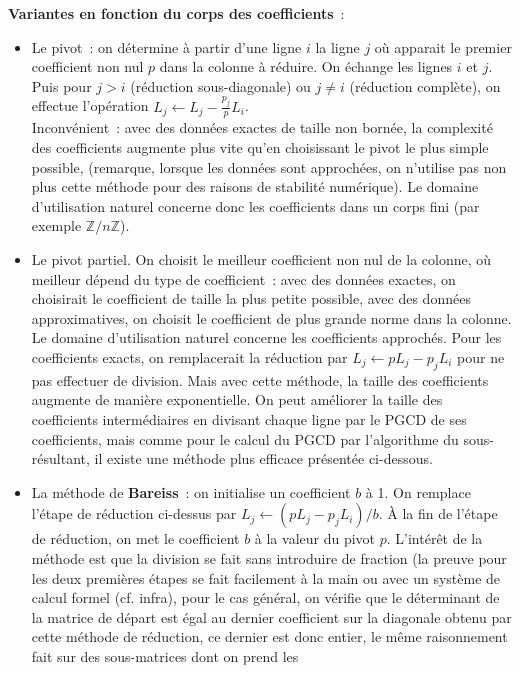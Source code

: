 \documentclass[a4paper,11pt]{book}
\begin{document}
\begin{giacjshere}
{\bf Variantes en fonction du corps des coefficients}~:
\begin{itemize}
\item Le pivot~: on détermine à partir d'une ligne $i$ 
la ligne $j$ où apparait le premier coefficient non nul $p$ dans
la colonne à réduire. On échange les lignes
$i$ et $j$. Puis pour $j>i$ (réduction sous-diagonale)
ou $j\neq i$ (réduction complète), on effectue l'opération
$L_j \leftarrow L_j - \frac{p_j}{p}L_i$.\\
Inconv\'enient~: avec des donn\'ees exactes de taille non born\'ee, 
la complexité des coefficients augmente plus vite qu'en choisissant 
le pivot le plus simple possible, (remarque, lorsque les donn\'ees 
sont approch\'ees, on n'utilise pas non plus cette méthode
pour des raisons de stabilit\'e num\'erique).
Le domaine d'utilisation naturel concerne donc les coefficients
dans un corps fini (par exemple $\mathbb{Z}/n\mathbb{Z}$).
\item Le pivot partiel. On choisit le meilleur coefficient non nul de la
colonne, où meilleur dépend du type de coefficient~: avec des données
exactes, on choisirait le coefficient de taille la plus petite possible,
avec des donn\'ees approximatives, on choisit
le coefficient de plus grande norme dans la colonne.
Le domaine d'utilisation naturel concerne les coefficients
approch\'es. Pour les coefficients exacts, on remplacerait la
réduction par $L_j \leftarrow pL_j -p_j L_i$ pour ne pas effectuer
de division. Mais avec cette méthode, la taille des coefficients
augmente de manière exponentielle. On peut améliorer
la taille des coefficients intermédiaires en divisant chaque
ligne par le PGCD de ses coefficients, mais comme pour le
calcul du PGCD par l'algorithme du sous-résultant, il existe
une méthode plus efficace présentée ci-dessous.
\item La m\'ethode de {\bf Bareiss}~: on initialise un coefficient $b$ \`a 1.
On remplace l'\'etape de r\'eduction ci-dessus
par $L_j \leftarrow (pL_j -p_j L_i)/b$.
\`A la fin de l'\'etape de r\'eduction, on met le coefficient $b$
\`a la valeur du pivot $p$. L'intérêt de la méthode est que la division
se fait sans introduire de fraction (la preuve pour les deux premi\`eres
\'etapes se fait facilement \`a la main ou avec
un système de calcul formel (cf. infra), pour le cas g\'en\'eral, on v\'erifie
que le d\'eterminant de la matrice de d\'epart
est \'egal au dernier coefficient sur la diagonale obtenu par
cette m\'ethode de r\'eduction, ce dernier est donc entier, le
m\^eme raisonnement fait sur des sous-matrices dont on prend les

\end{itemize}
\end{giacjshere}
\end{document}
